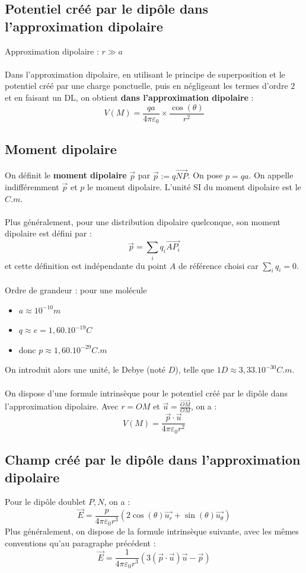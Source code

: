\documentclass[french]{book}
\theoremstyle{plain}
\theoremstyle{definition}
\theoremstyle{remark}
\begin{document}
\subsection{Potentiel créé par le dipôle dans l'approximation dipolaire}
Approximation dipolaire : $r\gg a$ \\ \\
Dans l'approximation dipolaire, en utilisant le principe de superposition et le potentiel créé par une charge ponctuelle, puis en négligeant les termes d'ordre $2$ et en faisant un DL, on obtient \textbf{dans l'approximation dipolaire} : $$V(M)=\frac{qa}{4\pi\varepsilon_0}\times\frac{\cos(\theta)}{r^2}$$
\subsection{Moment dipolaire}
On définit le \textbf{moment dipolaire} $\overrightarrow{p}$ par $\overrightarrow{p}:=q\overrightarrow{NP}$. On pose $p=qa$. On appelle indifféremment $\overrightarrow{p}$ et $p$ le moment dipolaire. L'unité SI du moment dipolaire est le $C.m$. \\ \\
Plus généralement, pour une distribution dipolaire quelconque, son moment dipolaire est défini par : $$\overrightarrow{p}=\sum_i q_i\overrightarrow{AP_i}$$ et cette définition est indépendante du point $A$ de référence choisi car $\displaystyle\sum_iq_i=0$. \\ \\
Ordre de grandeur : pour une molécule
\begin{itemize}
	\item $a\approx 10^{-10}m$
	\item $q\approx e = 1,60.10^{-19}C$
	\item donc $p\approx 1,60.10^{-29}C.m$
\end{itemize}
On introduit alors une unité, le Debye (noté $D$), telle que $1D\approx 3,33.10^{-30}C.m$. \\ \\
On dispose d'une formule intrinsèque pour le potentiel créé par le dipôle dans l'approximation dipolaire. Avec $r=OM$ et $\overrightarrow{u}=\displaystyle\frac{\overrightarrow{OM}}{OM}$, on a : $$V(M)=\frac{\overrightarrow{p}\cdot\overrightarrow{u}}{4\pi\varepsilon_0 r^2}$$
\subsection{Champ créé par le dipôle dans l'approximation dipolaire}
Pour le dipôle doublet ${P,N}$, on a : $$\overrightarrow{E}=\frac{p}{4\pi\varepsilon_0 r^3}(2\cos(\theta)\overrightarrow{u_r}+\sin(\theta)\overrightarrow{u_\theta})$$
Plus généralement, on dispose de la formule intrinsèque suivante, avec les mêmes conventions qu'au paragraphe précédent : $$\overrightarrow{E}=\frac{1}{4\pi\varepsilon_0 r^3}\left(3(\overrightarrow{p}\cdot\overrightarrow{u})\overrightarrow{u}-\overrightarrow{p}\right)$$
\end{document}
